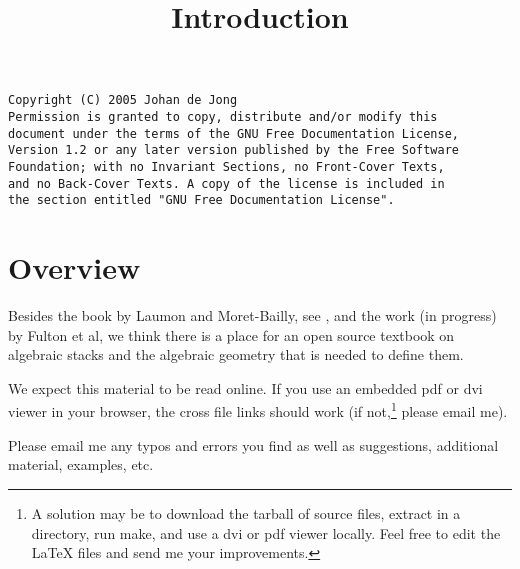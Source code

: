 

%


\title{Introduction}


\maketitle

\label{section-phantom}

\begin{verbatim}
Copyright (C) 2005 Johan de Jong
Permission is granted to copy, distribute and/or modify this
document under the terms of the GNU Free Documentation License,
Version 1.2 or any later version published by the Free Software
Foundation; with no Invariant Sections, no Front-Cover Texts,
and no Back-Cover Texts. A copy of the license is included in
the section entitled "GNU Free Documentation License".
\end{verbatim}

\tableofcontents

\section{Overview}
\label{section-overview}

\noindent
Besides the book by Laumon and Moret-Bailly, see \cite{LM-B}, and the work
(in progress) by Fulton et al, we think there is a place for an open source
textbook on algebraic stacks and the algebraic geometry that is needed
to define them.

\medskip\noindent
We expect this material to be read online. If you use an
embedded pdf or dvi viewer in your browser, the cross file
links should work (if not,\footnote{A solution may be
to download the tarball of source files, extract in a directory,
run make, and use a dvi or pdf viewer locally. Feel free to
edit the LaTeX files and send me your improvements.} please email me).

\medskip\noindent
Please email me any typos and errors you find as well as suggestions,
additional material, examples, etc.








